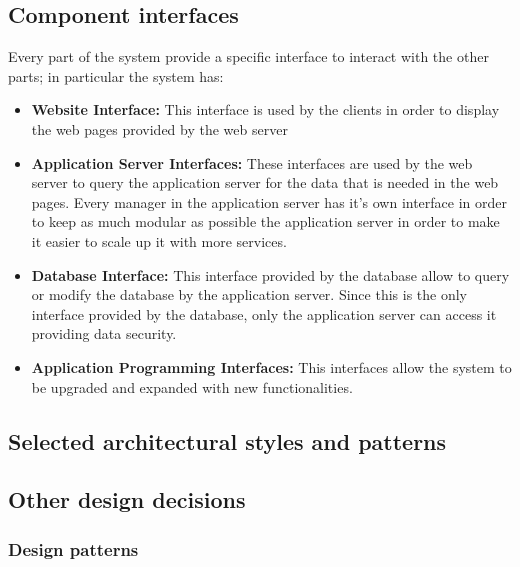 \subsection{Component interfaces}
	Every part of the system provide a specific interface to interact with the other parts; in particular the system has:
	\begin{itemize}
		\item \textbf{Website Interface:} This interface is used by the clients in order to display the web pages provided by the web server
		\item \textbf{Application Server Interfaces:} These interfaces are used by the web server to query the application server for the data that is needed in the web pages. Every manager in the application server has it's own interface in order to keep as much modular as possible the application server in order to make it easier to scale up it with more services.
		\item \textbf{Database Interface:} This interface provided by the database allow to query or modify the database by the application server. Since this is the only interface provided by the database, only the application server can access it providing data security.
		\item \textbf{Application Programming Interfaces:} This interfaces allow the system to be upgraded and expanded with new functionalities.
	\end{itemize}
\subsection{Selected architectural styles and patterns}
\subsection{Other design decisions}
	\subsubsection{Design patterns}